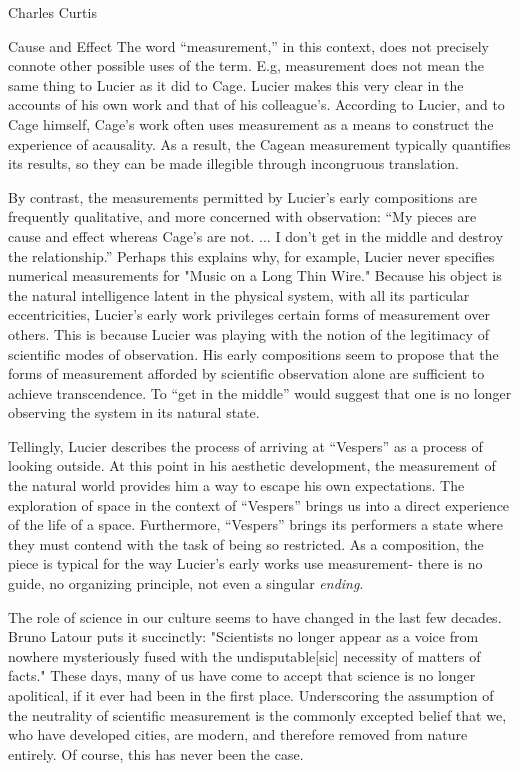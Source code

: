 \documentclass[a4paper,10pt]{report}
\numberwithin{equation}{section}
\begin{document}
\begin{chapter}{Charles Curtis}
\begin{section}{Cause and Effect}
The word ``measurement,'' in this context, does not precisely connote other possible uses of the term. E.g, measurement does not mean the same thing to Lucier as it did to Cage. Lucier makes this very clear in the accounts of his own work and that of his colleague's. According to Lucier, and to Cage himself, Cage's work often uses measurement as a means to construct the experience of acausality. As a result, the Cagean measurement typically quantifies its results, so they can be made illegible through incongruous translation. 

By contrast, the measurements permitted by Lucier's early compositions are frequently qualitative, and more concerned with observation: ``My pieces are cause and effect whereas Cage's are not. ... I don't get in the middle and destroy the relationship.''\cite[p.~230]{lucier1995} Perhaps this explains why, for example, Lucier never specifies numerical measurements for "Music on a Long Thin Wire." Because his object is the natural intelligence latent in the physical system, with all its particular eccentricities, Lucier's early work privileges certain forms of measurement over others. This is because Lucier was playing with the notion of the legitimacy of scientific modes of observation. His early compositions seem to propose that the forms of measurement afforded by scientific observation alone are sufficient to achieve transcendence. To ``get in the middle'' would suggest that one is no longer observing the system in its natural state. 

Tellingly, Lucier describes the process of arriving at ``Vespers'' as a process of looking outside.\cite[p.84]{lucier2012} At this point in his aesthetic development, the measurement of the natural world provides him a way to escape his own expectations. The exploration of space in the context of  ``Vespers'' brings us into a direct experience of the life of a space. Furthermore, ``Vespers'' brings its performers a state where they must contend with the task of being so restricted. As a composition, the piece is typical for the way Lucier's early works use measurement- there is no guide, no organizing principle, not even a singular \emph{ending}. 

The role of science in our culture seems to have changed in the last few decades. Bruno Latour puts it succinctly: "Scientists no longer appear as a voice from nowhere mysteriously fused with the undisputable[sic] necessity of matters of facts." \cite{Latour2011} These days, many of us have come to accept that science is no longer apolitical, if it ever had been in the first place. Underscoring the assumption of the neutrality of scientific measurement is the commonly excepted belief that we, who have developed cities, are modern, and therefore removed from nature entirely. Of course, this has never been the case.


\end{section}
\end{chapter}
\end{document}
